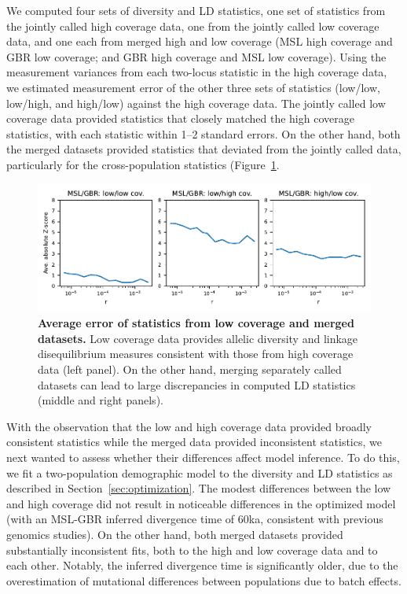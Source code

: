 \documentclass[]{article}
\begin{document}
We computed four sets of diversity and LD statistics, one set of statistics
from the jointly called high coverage data, one from the jointly called low
coverage data, and one each from merged high and low coverage (MSL high
coverage and GBR low coverage; and GBR high coverage and MSL low coverage).
Using the measurement variances from each two-locus statistic in the high
coverage data, we estimated measurement error of the other three sets of
statistics (low/low, low/high, and high/low) against the high coverage data.
The jointly called low coverage data provided statistics that closely matched
the high coverage statistics, with each statistic within 1--2 standard errors.
On the other hand, both the merged datasets provided statistics that deviated
from the jointly called data, particularly for the cross-population statistics
(Figure~\ref{fig:supp-merged-data-SEs}.

\begin{figure}[ht!]
    \centering
    \includegraphics[width=5in]{figures/supp-SE-merged-data}
    \caption{
        \textbf{Average error of statistics from low coverage and merged
        datasets.} Low coverage data provides allelic diversity and linkage
        disequilibrium measures consistent with those from high coverage data
        (left panel). On the other hand, merging separately called datasets can
        lead to large discrepancies in computed LD statistics (middle and right
        panels).
    }
    \label{fig:supp-merged-data-SEs}
\end{figure}

With the observation that the low and high coverage data provided broadly
consistent statistics while the merged data provided inconsistent statistics,
we next wanted to assess whether their differences affect model inference. To
do this, we fit a two-population demographic model to the diversity and LD
statistics as described in Section~\ref{sec:optimization}. The modest
differences between the low and high coverage did not result in noticeable
differences in the optimized model (with an MSL-GBR inferred divergence time of
60ka, consistent with previous genomics studies). On the other hand, both
merged datasets provided substantially inconsistent fits, both to the high and
low coverage data and to each other. Notably, the inferred divergence time is
significantly older, due to the overestimation of mutational differences
between populations due to batch effects.
\end{document}
